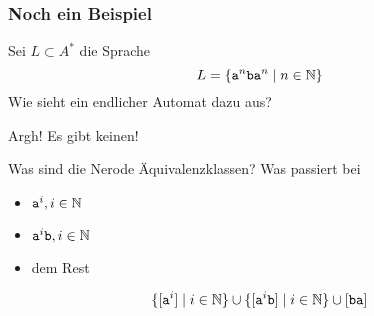 \begin{frame}
	\frametitle{Noch ein Beispiel}
	Sei $L \subset A^\ast$ die Sprache 
	$$L = \{ \mathtt a^n \mathtt b \mathtt a^n \mid n \in \mathbb{N} \}$$ Wie sieht ein endlicher Automat dazu aus? \pause 
	\begin{minipage}{0.49\linewidth}\vspace*{8em}
		\centering \vfill
		Argh! Es gibt keinen! \vspace*{4em}
	\end{minipage}\pause
	\begin{minipage}{0.49\linewidth}
		Was sind die Nerode Äquivalenz\-klassen? \pause
		Was passiert bei
		\begin{itemize}[<+->]
			\item $\mathtt a^i, i \in \mathbb{N}$
			\item $\mathtt a^i \mathtt b, i \in \mathbb{N}$
			\item dem Rest
		\end{itemize} \pause
		$$\{[\mathtt a^i] \mid i \in \mathbb{N} \} \cup \{[\mathtt a^i \mathtt b] \mid i \in \mathbb{N} \} \cup [\mathtt{ba}]$$
		
	\end{minipage}
\end{frame}


